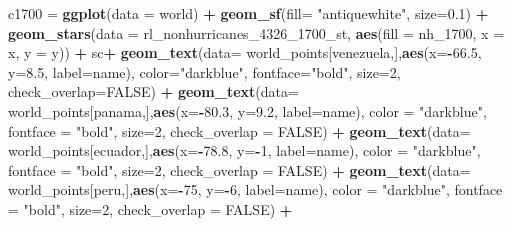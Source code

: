 \documentclass[12pt,oneside]{reedthesis}
\newenvironment{Shaded}{\begin{snugshade}}{\end{snugshade}}
\newcommand{\DataTypeTok}[1]{\textcolor[rgb]{0.13,0.29,0.53}{#1}}
\newcommand{\DecValTok}[1]{\textcolor[rgb]{0.00,0.00,0.81}{#1}}
\newcommand{\FloatTok}[1]{\textcolor[rgb]{0.00,0.00,0.81}{#1}}
\newcommand{\KeywordTok}[1]{\textcolor[rgb]{0.13,0.29,0.53}{\textbf{#1}}}
\newcommand{\NormalTok}[1]{#1}
\newcommand{\OperatorTok}[1]{\textcolor[rgb]{0.81,0.36,0.00}{\textbf{#1}}}
\newcommand{\OtherTok}[1]{\textcolor[rgb]{0.56,0.35,0.01}{#1}}
\newcommand{\StringTok}[1]{\textcolor[rgb]{0.31,0.60,0.02}{#1}}
\begin{document}
\begin{Shaded}
\begin{Highlighting}[]
\NormalTok{c1700 =}\StringTok{ }\KeywordTok{ggplot}\NormalTok{(}\DataTypeTok{data =}\NormalTok{ world) }\OperatorTok{+}\StringTok{ }
\StringTok{  }\KeywordTok{geom_sf}\NormalTok{(}\DataTypeTok{fill=} \StringTok{"antiquewhite"}\NormalTok{, }\DataTypeTok{size=}\FloatTok{0.1}\NormalTok{) }\OperatorTok{+}\StringTok{ }
\StringTok{  }\KeywordTok{geom_stars}\NormalTok{(}\DataTypeTok{data =}\NormalTok{ rl_nonhurricanes_}\DecValTok{4326}\NormalTok{_}\DecValTok{1700}\NormalTok{_st, }\KeywordTok{aes}\NormalTok{(}\DataTypeTok{fill =}\NormalTok{ nh_}\DecValTok{1700}\NormalTok{, }\DataTypeTok{x =}\NormalTok{ x, }\DataTypeTok{y =}\NormalTok{ y)) }\OperatorTok{+}\StringTok{ }
\StringTok{  }\NormalTok{sc}\OperatorTok{+}
\StringTok{  }\KeywordTok{geom_text}\NormalTok{(}\DataTypeTok{data=}\NormalTok{ world_points[venezuela,],}\KeywordTok{aes}\NormalTok{(}\DataTypeTok{x=}\OperatorTok{-}\FloatTok{66.5}\NormalTok{, }\DataTypeTok{y=}\FloatTok{8.5}\NormalTok{, }\DataTypeTok{label=}\NormalTok{name), }\DataTypeTok{color=}\StringTok{"darkblue"}\NormalTok{, }\DataTypeTok{fontface=}\StringTok{"bold"}\NormalTok{, }\DataTypeTok{size=}\DecValTok{2}\NormalTok{, }\DataTypeTok{check_overlap=}\OtherTok{FALSE}\NormalTok{) }\OperatorTok{+}
\StringTok{  }\KeywordTok{geom_text}\NormalTok{(}\DataTypeTok{data=}\NormalTok{ world_points[panama,],}\KeywordTok{aes}\NormalTok{(}\DataTypeTok{x=}\OperatorTok{-}\FloatTok{80.3}\NormalTok{, }\DataTypeTok{y=}\FloatTok{9.2}\NormalTok{, }\DataTypeTok{label=}\NormalTok{name), }\DataTypeTok{color =} \StringTok{"darkblue"}\NormalTok{, }\DataTypeTok{fontface =} \StringTok{"bold"}\NormalTok{, }\DataTypeTok{size=}\DecValTok{2}\NormalTok{, }\DataTypeTok{check_overlap =} \OtherTok{FALSE}\NormalTok{) }\OperatorTok{+}\StringTok{ }
\StringTok{  }\KeywordTok{geom_text}\NormalTok{(}\DataTypeTok{data=}\NormalTok{ world_points[ecuador,],}\KeywordTok{aes}\NormalTok{(}\DataTypeTok{x=}\OperatorTok{-}\FloatTok{78.8}\NormalTok{, }\DataTypeTok{y=}\OperatorTok{-}\DecValTok{1}\NormalTok{, }\DataTypeTok{label=}\NormalTok{name), }\DataTypeTok{color =} \StringTok{"darkblue"}\NormalTok{, }\DataTypeTok{fontface =} \StringTok{"bold"}\NormalTok{, }\DataTypeTok{size=}\DecValTok{2}\NormalTok{, }\DataTypeTok{check_overlap =} \OtherTok{FALSE}\NormalTok{) }\OperatorTok{+}
\StringTok{  }\KeywordTok{geom_text}\NormalTok{(}\DataTypeTok{data=}\NormalTok{ world_points[peru,],}\KeywordTok{aes}\NormalTok{(}\DataTypeTok{x=}\OperatorTok{-}\DecValTok{75}\NormalTok{, }\DataTypeTok{y=}\OperatorTok{-}\DecValTok{6}\NormalTok{, }\DataTypeTok{label=}\NormalTok{name), }\DataTypeTok{color =} \StringTok{"darkblue"}\NormalTok{, }\DataTypeTok{fontface =} \StringTok{"bold"}\NormalTok{, }\DataTypeTok{size=}\DecValTok{2}\NormalTok{, }\DataTypeTok{check_overlap =} \OtherTok{FALSE}\NormalTok{) }\OperatorTok{+}

\end{Highlighting}
\end{Shaded}
\end{document}
